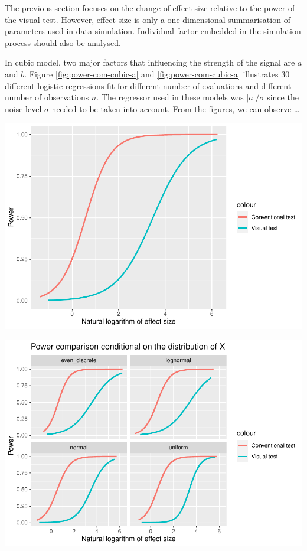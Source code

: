 \documentclass[]{interact}
\theoremstyle{plain}%
\theoremstyle{definition}
\theoremstyle{remark}
\begin{document}
The previous section focuses on the change of effect size relative to
the power of the visual test. However, effect size is only a one
dimensional summarisation of parameters used in data simulation.
Individual factor embedded in the simulation process should also be
analysed.

In cubic model, two major factors that influencing the strength of the
signal are \(a\) and \(b\). Figure \ref{fig:power-com-cubic-a} and
\ref{fig:power-com-cubic-a} illustrates 30 different logistic
regressions fit for different number of evaluations and different number
of observations \(n\). The regressor used in these models was
\(|a|/\sigma\) since the noise level \(\sigma\) needed to be taken into
account. From the figures, we can observe \ldots{}

\includegraphics{paper_comparison_files/figure-latex/power-vs-log-effect-size-1.pdf}

\includegraphics{paper_comparison_files/figure-latex/power-vs-log-effect-size-given-x-dist-1.pdf}
\end{document}
